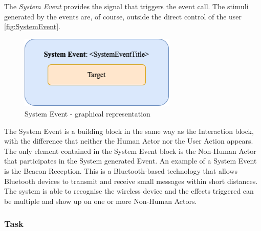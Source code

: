 The \emph{System Event} provides the signal that triggers the event call. The stimuli generated by the events are, of course, outside the direct control of the user \autoref{fig:SystemEvent}.
\begin{figure}[h]
	\centering
	\includegraphics[width=7.5cm]{Figures/Conceptual Model/SystemEvent.png}
	\caption{System Event - graphical representation}
	\label{fig:SystemEvent}
\end{figure}
The System Event is a building block in the same way as the Interaction block, with the difference that neither the Human Actor nor the User Action appears. The only element contained in the System Event block is the Non-Human Actor that participates in the System generated Event.
An example of a System Event is the Beacon Reception. This is a Bluetooth-based technology that allows Bluetooth devices to transmit and receive small messages within short distances. The system is able to recognise the wireless device and the effects triggered can be multiple and show up on one or more Non-Human Actors. 

\subsubsection*{Task}


